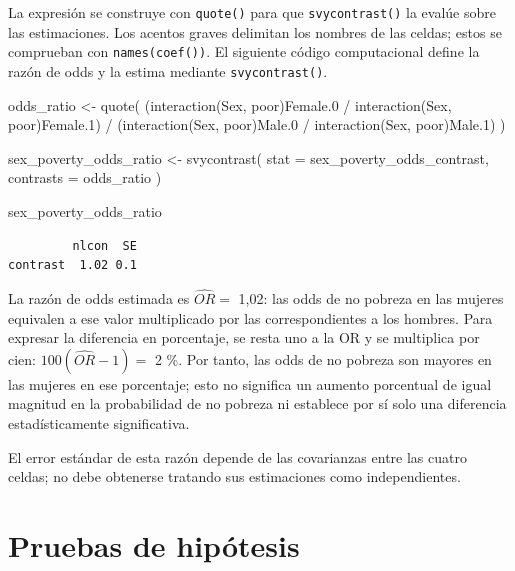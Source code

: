 \documentclass[
  spanish,
  11pt,
  letterpaper,
  oneside,
  open=any]{scrbook}
\newenvironment{Shaded}{\begin{snugshade}}{\end{snugshade}}
\newcommand{\AttributeTok}[1]{\textcolor[rgb]{0.40,0.45,0.13}{#1}}
\newcommand{\FunctionTok}[1]{\textcolor[rgb]{0.28,0.35,0.67}{#1}}
\newcommand{\NormalTok}[1]{\textcolor[rgb]{0.00,0.23,0.31}{#1}}
\newcommand{\OtherTok}[1]{\textcolor[rgb]{0.00,0.23,0.31}{#1}}
\newcommand{\SpecialCharTok}[1]{\textcolor[rgb]{0.37,0.37,0.37}{#1}}
\newcommand{\StringTok}[1]{\textcolor[rgb]{0.13,0.47,0.30}{#1}}
\begin{document}
La expresión se construye con \texttt{quote()} para que
\texttt{svycontrast()} la evalúe sobre las estimaciones. Los acentos
graves delimitan los nombres de las celdas; estos se comprueban con
\texttt{names(coef())}. El siguiente código computacional define la
razón de odds y la estima mediante \texttt{svycontrast()}.

\begin{Shaded}
\begin{Highlighting}[]
\NormalTok{odds\_ratio }\OtherTok{\textless{}{-}} \FunctionTok{quote}\NormalTok{(}
\NormalTok{  (}\StringTok{\textasciigrave{}}\AttributeTok{interaction(Sex, poor)Female.0}\StringTok{\textasciigrave{}} \SpecialCharTok{/}
    \StringTok{\textasciigrave{}}\AttributeTok{interaction(Sex, poor)Female.1}\StringTok{\textasciigrave{}}\NormalTok{) }\SpecialCharTok{/}
\NormalTok{  (}\StringTok{\textasciigrave{}}\AttributeTok{interaction(Sex, poor)Male.0}\StringTok{\textasciigrave{}} \SpecialCharTok{/}
    \StringTok{\textasciigrave{}}\AttributeTok{interaction(Sex, poor)Male.1}\StringTok{\textasciigrave{}}\NormalTok{)}
\NormalTok{)}

\NormalTok{sex\_poverty\_odds\_ratio }\OtherTok{\textless{}{-}} \FunctionTok{svycontrast}\NormalTok{(}
  \AttributeTok{stat =}\NormalTok{ sex\_poverty\_odds\_contrast,}
  \AttributeTok{contrasts =}\NormalTok{ odds\_ratio}
\NormalTok{)}

\NormalTok{sex\_poverty\_odds\_ratio}
\end{Highlighting}
\end{Shaded}

\begin{verbatim}
         nlcon  SE
contrast  1.02 0.1
\end{verbatim}

La razón de odds estimada es \(\widehat{OR}=\) 1,02: las odds de no
pobreza en las mujeres equivalen a ese valor multiplicado por las
correspondientes a los hombres. Para expresar la diferencia en
porcentaje, se resta uno a la OR y se multiplica por cien:
\(100(\widehat{OR}-1)=\) 2 \%. Por tanto, las odds de no pobreza son
mayores en las mujeres en ese porcentaje; esto no significa un aumento
porcentual de igual magnitud en la probabilidad de no pobreza ni
establece por sí solo una diferencia estadísticamente significativa.

El error estándar de esta razón depende de las covarianzas entre las
cuatro celdas; no debe obtenerse tratando sus estimaciones como
independientes.

\section{Pruebas de
hipótesis}\label{sec-pruebas-de-hipotesis-sobre-proporciones}
\end{document}
